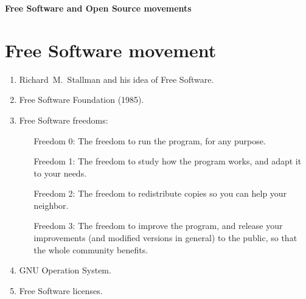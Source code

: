 \documentclass[10pt,a4paper]{article}
\begin{document}
\pagestyle{empty}
\pagestyle{fancy}
\rhead{\today}


\begin{center}
{\LARGE \bfseries Free Software and Open Source movements}
\end{center}

\section{Free Software movement}

\begin{enumerate}
  \item Richard~M.~Stallman and his idea of Free Software.
  \item Free Software Foundation (1985).
  \item Free Software freedoms:
  \begin{enumerate}
    \item[Freedom 0:] The freedom to run the program, for any purpose.
    \item[Freedom 1:] The freedom to study how the program works, and adapt it to 
your needs.
    \item[Freedom 2:] The freedom to redistribute copies so you can help your 
neighbor.
    \item[Freedom 3:] The freedom to improve the program, and release your 
improvements (and modified versions in general) to the public, so that the 
whole community benefits.
  \end{enumerate}
  \item GNU Operation System.
  \item Free Software licenses.
\end{enumerate}
\end{document}
